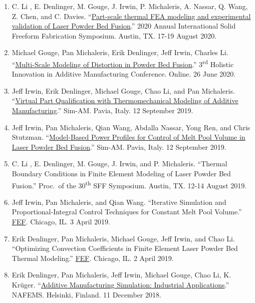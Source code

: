 \documentclass[10.5pt,letterpaper]{article}
\begin{document}
\begin{enumerate}[leftmargin=*]
	\setlength{\parskip}{0em}
	\item C. Li , E. Denlinger, M. Gouge, J. Irwin, P. Michaleris, A. Nassar, Q. Wang, Z. Chen, and C. Davies. ``\href{http://www.programmaster.org/PM/PM.nsf/ApprovedAbstracts/22EF15232DA24C648525855B0050B6B1?OpenDocument}{Part-scale thermal FEA modeling and experimental validation of Laser Powder Bed Fusion}.'' 2020 Annual International Solid Freeform Fabrication Symposium. Austin, TX.  17-19 August 2020.
	\item Michael Gouge, Pan Michaleris, Erik Denlinger, Jeff Irwin, Charles Li. ``\href{https://nserc-hi-am.ca/2020/conference-program/}{Multi-Scale Modeling of Distortion in Powder Bed Fusion}.'' 3\textsuperscript{rd} Holistic Innovation in Additive Manufacturing Conference. Online.  26 June 2020.
	\item Jeff Irwin, Erik Denlinger, Michael Gouge, Chao Li, and Pan Michaleris.  ``\href{http://congress.cimne.com/sim-am2019/frontal/Doc/IndustrialWorkshops/Autodesk.pdf}{Virtual Part Qualification with Thermomechanical Modeling of Additive Manufacturing}.'' Sim-AM.  Pavia, Italy.  12 September 2019.
	\item Jeff Irwin, Pan Michaleris, Qian Wang,  Abdalla  Nassar, Yong Ren, and Chris Stutzman.  ``\href{http://congress.cimne.com/sim-am2019/admin/files/fileabstract/a464.pdf}{Model-Based Power Profiles for Control of Melt Pool Volume in Laser Powder Bed Fusion}.'' Sim-AM.  Pavia, Italy.  12 September 2019.
	\item C. Li , E. Denlinger, M. Gouge, J. Irwin, and P. Michaleris. ``Thermal Boundary Conditions in Finite Element Modeling of Laser Powder Bed Fusion.'' Proc.\ of the 30\textsuperscript{th} SFF Symposium. Austin, TX.  12-14 August 2019.
	\item Jeff Irwin, Pan Michaleris, and Qian Wang.  ``Iterative Simulation and Proportional-Integral Control Techniques for Constant Melt Pool Volume.''  \href{http://www.fef2019.org/}{FEF}\@.  Chicago, IL.  3 April 2019.
	\item Erik Denlinger, Pan Michaleris, Michael Gouge, Jeff Irwin, and Chao Li.  ``Optimizing Convection Coefficients in Finite Element Laser Powder Bed Thermal Modeling.''  \href{http://www.fef2019.org/}{FEF}\@.  Chicago, IL.  2 April 2019.
	\item Erik Denlinger, Pan Michaleris, Jeff Irwin, Michael Gouge, Chao Li, K. Kr{\"u}ger.  ``\href{https://www.nafems.org/publications/resource_center/s_dec_18_dach_20/}{Additive Manufacturing Simulation:  Industrial Applications}.''  NAFEMS\@.  Helsinki, Finland.  11 December 2018.

\end{enumerate}
\end{document}
